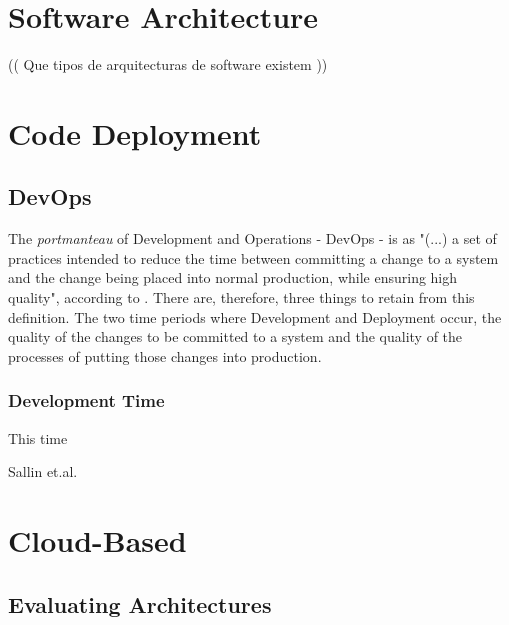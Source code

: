\section{Software Architecture}\label{state-of-the-art:s:software-architecture}

(( Que tipos de arquitecturas de software existem ))

\section{Code Deployment}\label{state-of-the-art:s:code-deployment}

\subsection{DevOps}\label{state-of-the-art:ss:devops}

The \textit{portmanteau} of Development and Operations - DevOps - is as "(...) a set of practices intended to reduce the time between committing a change to a system and the change being placed into normal production, while ensuring high quality", according to \parencite{bass_weber_zhu_2015}. There are, therefore, three things to retain from this definition. The two time periods where Development and Deployment occur, the quality of the changes to be committed to a system and the quality of the processes of putting those changes into production.

\subsubsection{Development Time}
This time






Sallin et.al. \parencite{sallin_kropp_anslow_quilty_meier_2021}

\section{Cloud-Based}\label{state-of-the-art:s:cloud-based}

\subsection{Evaluating Architectures}\label{state-of-the-art:ss:evaluating-architectures}

